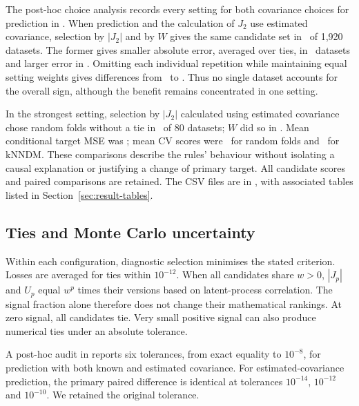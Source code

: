 \documentclass[11pt,a4paper]{article}
\begin{document}
The post-hoc choice analysis records every setting for both covariance choices for prediction in . When prediction and the calculation of $J_2$ use estimated covariance, selection by $|J_2|$ and by $W$ gives the same candidate set in \NestedSameChoices\ of 1,920 datasets. The former gives smaller absolute error, averaged over ties, in \NestedWins\ datasets and larger error in \NestedLosses. Omitting each individual repetition while maintaining equal setting weights gives differences from \NestedOmissionMin\ to \NestedOmissionMax. Thus no single dataset accounts for the overall sign, although the benefit remains concentrated in one setting.

In the strongest setting, selection by $|J_2|$ calculated using estimated covariance chose random folds without a tie in \NestedStrongRandomChoices\ of 80 datasets; $W$ did so in \NestedStrongWRandomChoices. Mean conditional target MSE was \NestedStrongTargetRisk; mean CV scores were \NestedStrongCVRandom\ for random folds and \NestedStrongCVKnn\ for kNNDM. These comparisons describe the rules' behaviour without isolating a causal explanation or justifying a change of primary target. All candidate scores and paired comparisons are retained. The CSV files are in , with associated tables listed in Section~\ref{sec:result-tables}.

\subsection{Ties and Monte Carlo uncertainty}
\label{sec:uncertainty}
Within each configuration, diagnostic selection minimises the stated criterion. Losses are averaged for ties within $10^{-12}$. When all candidates share $w>0$, $|J_p|$ and $U_p$ equal $w^p$ times their versions based on latent-process correlation. The signal fraction alone therefore does not change their mathematical rankings. At zero signal, all candidates tie. Very small positive signal can also produce numerical ties under an absolute tolerance.

A post-hoc audit in  reports six tolerances, from exact equality to $10^{-8}$, for prediction with both known and estimated covariance. For estimated-covariance prediction, the primary paired difference is identical at tolerances $10^{-14}$, $10^{-12}$ and $10^{-10}$. We retained the original tolerance.
\end{document}
